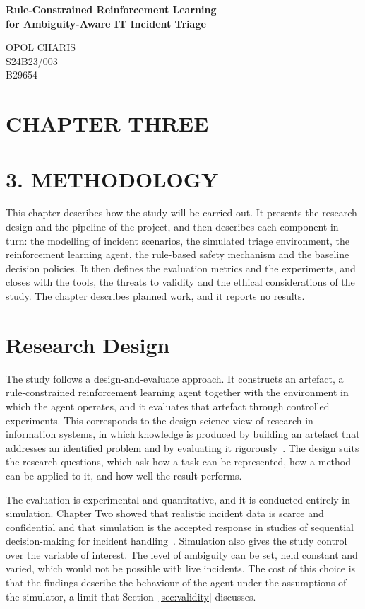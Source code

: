 \documentclass[12pt,a4paper]{article}
\begin{document}
\begin{center}
  {\LARGE\bfseries Rule-Constrained Reinforcement Learning\\for Ambiguity-Aware IT Incident Triage\par}
  \vspace{1.5em}
  {\large OPOL CHARIS\\
  S24B23/003\\
  B29654\par}
\end{center}
\vspace{1.5em}

\section*{CHAPTER THREE}

\section*{3. METHODOLOGY}

This chapter describes how the study will be carried out. It presents the research design and the pipeline of the project, and then describes each component in turn: the modelling of incident scenarios, the simulated triage environment, the reinforcement learning agent, the rule-based safety mechanism and the baseline decision policies. It then defines the evaluation metrics and the experiments, and closes with the tools, the threats to validity and the ethical considerations of the study. The chapter describes planned work, and it reports no results.

\section{Research Design}

The study follows a design-and-evaluate approach. It constructs an artefact, a rule-constrained reinforcement learning agent together with the environment in which the agent operates, and it evaluates that artefact through controlled experiments. This corresponds to the design science view of research in information systems, in which knowledge is produced by building an artefact that addresses an identified problem and by evaluating it rigorously~\cite{hevner2004}. The design suits the research questions, which ask how a task can be represented, how a method can be applied to it, and how well the result performs.

The evaluation is experimental and quantitative, and it is conducted entirely in simulation. Chapter Two showed that realistic incident data is scarce and confidential and that simulation is the accepted response in studies of sequential decision-making for incident handling~\cite{remil2024,hammar2025,dunsin2025}. Simulation also gives the study control over the variable of interest. The level of ambiguity can be set, held constant and varied, which would not be possible with live incidents. The cost of this choice is that the findings describe the behaviour of the agent under the assumptions of the simulator, a limit that Section~\ref{sec:validity} discusses.
\end{document}
